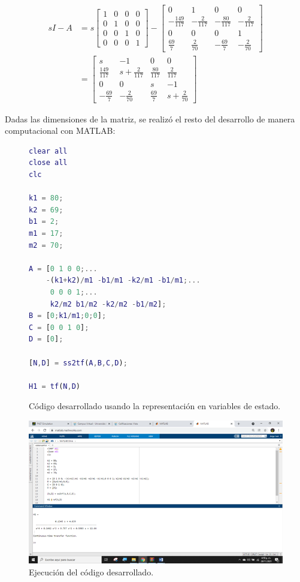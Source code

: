 \documentclass{article}
\begin{document}
\begin{enumerate}
\begin{align}
  sI-A &= s
  \begin{bmatrix}
    1 & 0 & 0 & 0\\
    0 & 1 & 0 & 0\\
    0 & 0 & 1 & 0\\
    0 & 0 & 0 & 1 
  \end{bmatrix}
  -
  \begin{bmatrix}
    0 & 1 & 0 & 0\\
    -\frac{149}{117} & -\frac{2}{117} & -\frac{80}{117} & -\frac{2}{117}\\
    0 & 0 & 0 & 1\\
    \frac{69}{7} & \frac{2}{70} & -\frac{69}{7} & -\frac{2}{70}
  \end{bmatrix}\\
  &=
  \begin{bmatrix}
    s & -1 & 0 & 0\\
    \frac{149}{117} & s+\frac{2}{117} & \frac{80}{117} & \frac{2}{117}\\
    0 & 0 & s & -1\\
    -\frac{69}{7} & -\frac{2}{70} & \frac{69}{7} & s+\frac{2}{70}
  \end{bmatrix}
\end{align}

Dadas las dimensiones de la matriz, se realizó el resto del desarrollo de manera computacional con MATLAB:

\begin{figure}
\begin{lstlisting}[language=matlab]
clear all
close all
clc
 
k1 = 80;
k2 = 69;
b1 = 2;
m1 = 17;
m2 = 70;
 
A = [0 1 0 0;...
    -(k1+k2)/m1 -b1/m1 -k2/m1 -b1/m1;...
     0 0 0 1;...
     k2/m2 b1/m2 -k2/m2 -b1/m2];
B = [0;k1/m1;0;0];
C = [0 0 1 0];
D = [0];
 
[N,D] = ss2tf(A,B,C,D);
 
H1 = tf(N,D)
\end{lstlisting}
\caption{Código desarrollado usando la representación en variables de estado.}
\end{figure}

\begin{figure}
  \centering
  \includegraphics[width=15cm]{img/codigo.png}
  \caption{Ejecución del código desarrollado.}
\end{figure}


\end{enumerate}
\end{document}
